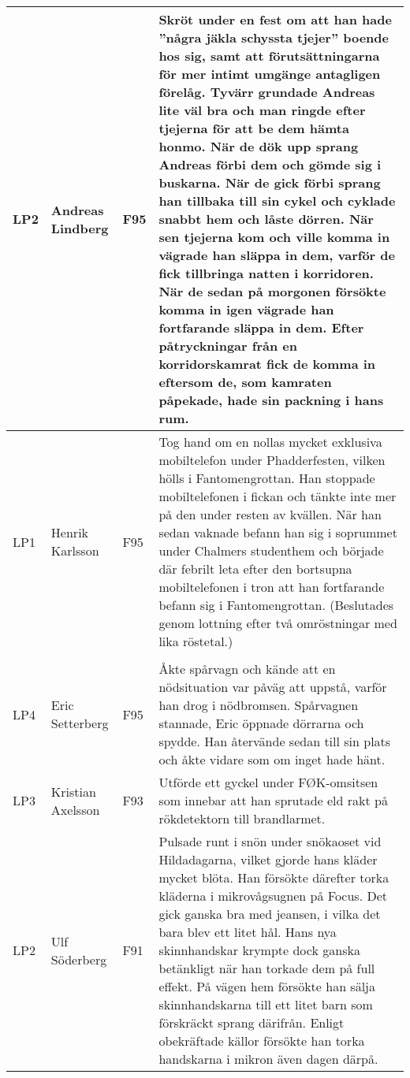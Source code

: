 \documentclass[a4paper]{article}
\begin{document}
\begin{longtable}{p{5mm}>{\raggedright\arraybackslash}p{30mm}p{10mm}p{108mm}}
LP2 & Andreas Lindberg & F95 & Skröt under en fest om att han hade ''några jäkla schyssta tjejer'' boende hos sig, samt att förutsättningarna för mer intimt umgänge antagligen förelåg. Tyvärr grundade Andreas lite väl bra och man ringde efter tjejerna för att be dem hämta honmo. När de dök upp sprang Andreas förbi dem och gömde sig i buskarna. När de gick förbi sprang han tillbaka till sin cykel och cyklade snabbt hem och låste dörren. När sen tjejerna kom och ville komma in vägrade han släppa in dem, varför de fick tillbringa natten i korridoren. När de sedan på morgonen försökte komma in igen vägrade han fortfarande släppa in dem. Efter påtryckningar från en korridorskamrat fick de komma in eftersom de, som kamraten påpekade, hade sin packning i hans rum. \\ \hline

LP1 & Henrik Karlsson & F95 & Tog hand om en nollas mycket exklusiva mobiltelefon under Phadderfesten, vilken hölls i Fantomengrottan. Han stoppade mobiltelefonen i fickan och tänkte inte mer på den under resten av kvällen. När han sedan vaknade befann han sig i soprummet under Chalmers studenthem och började där febrilt leta efter den bortsupna mobiltelefonen i tron att han fortfarande befann sig i Fantomengrottan. (Beslutades genom lottning efter två omröstningar med lika röstetal.) \\ \hline

\rowcolor{veryLightGray} \multicolumn{4}{l}{\textbf{1995/1996}} \\ \hline

LP4 & Eric Setterberg & F95 & Åkte spårvagn och kände att en nödsituation var påväg att uppstå, varför han drog i nödbromsen. Spårvagnen stannade, Eric öppnade dörrarna och spydde. Han återvände sedan till sin plats och åkte vidare som om inget hade hänt. \\ \hline

LP3 & Kristian Axelsson & F93 & Utförde ett gyckel under FØK-omsitsen som innebar att han sprutade eld rakt på rökdetektorn till brandlarmet. \\ \hline %

LP2 & Ulf Söderberg & F91 & Pulsade runt i snön under snökaoset vid Hildadagarna, vilket gjorde hans kläder mycket blöta. Han försökte därefter torka kläderna i mikrovågsugnen på Focus. Det gick ganska bra med jeansen, i vilka det bara blev ett litet hål. Hans nya skinnhandskar krympte dock ganska betänkligt när han torkade dem på full effekt. På vägen hem försökte han sälja skinnhandskarna till ett litet barn som förskräckt sprang därifrån. Enligt obekräftade källor försökte han torka handskarna i mikron även dagen därpå. \\ \hline


\end{longtable}
\end{document}
